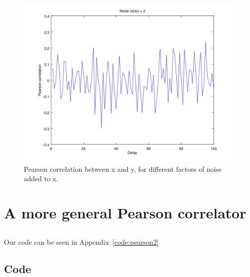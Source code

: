 \documentclass{article}
\begin{document}
\begin{figure}[H]
	\includegraphics[width=.49\textwidth]{plot2noise.png}
	\caption{Pearson correlation between x and y, for different factors of noise added to x.}
	\label{fig:1g2}
\end{figure}

\section{A more general Pearson correlator}
\subsection{}
Our code can be seen in Appendix~\ref{code:pearson2}
\begin{appendices}
\section{Code}
 
 
 
 
 
 
\end{appendices}
\end{document}
